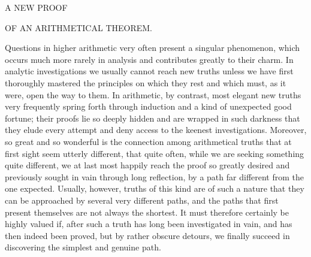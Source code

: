 \begin{center}\Large A NEW PROOF\end{center}

\begin{center}\large OF AN ARITHMETICAL THEOREM.\end{center}

\BookRule{35mm}


Questions in higher arithmetic very often present a singular phenomenon, which occurs much more rarely in analysis and contributes greatly to their charm. In analytic investigations we usually cannot reach new truths unless we have first thoroughly mastered the principles on which they rest and which must, as it were, open the way to them. In arithmetic, by contrast, most elegant new truths very frequently spring forth through induction and a kind of unexpected good fortune; their proofs lie so deeply hidden and are wrapped in such darkness that they elude every attempt and deny access to the keenest investigations. Moreover, so great and so wonderful is the connection among arithmetical truths that at first sight seem utterly different, that quite often, while we are seeking something quite different, we at last most happily reach the proof so greatly desired and previously sought in vain through long reflection, by a path far different from the one expected. Usually, however, truths of this kind are of such a nature that they can be approached by several very different paths, and the paths that first present themselves are not always the shortest. It must therefore certainly be highly valued if, after such a truth has long been investigated in vain, and has then indeed been proved, but by rather obscure detours, we finally succeed in discovering the simplest and genuine path.


